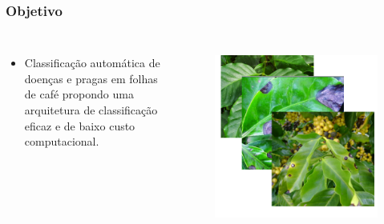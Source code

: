 \documentclass[aspectratio=169]{beamer}
\begin{document}
\begin{frame}
    \frametitle{Objetivo}
    \begin{columns}


        \begin{itemize}
            \item Classificação automática de doenças e pragas em folhas de café propondo uma arquitetura de classificação eficaz e de baixo custo computacional.
        \end{itemize}



        \begin{figure}
            \centering
            \includegraphics[scale= 0.25]{img/folhass.png}
            \label{fig:enter-label}
        \end{figure}

    \end{columns}
\end{frame}

\end{document}
